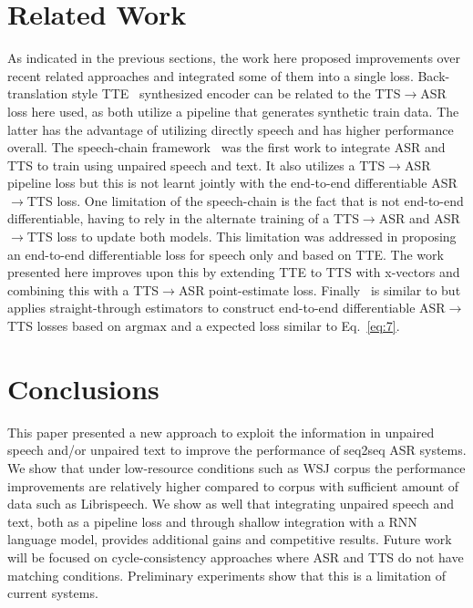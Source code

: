 \documentclass[a4paper]{article}
\begin{document}
\section{Related Work}
As indicated in the previous sections, the work here proposed improvements over recent related approaches and integrated some of them into a single loss. Back-translation style TTE~\cite{hayashi2018back} synthesized encoder can be related to the TTS$\rightarrow$ASR loss here used, as both utilize a pipeline that generates synthetic train data. The latter has the advantage of utilizing directly speech and has higher performance overall. The speech-chain framework~\cite{tjandra2017listening} was the first work to integrate ASR and TTS to train using unpaired speech and text. It also utilizes a TTS$\rightarrow$ASR pipeline loss but this is not learnt jointly with the end-to-end differentiable ASR$\rightarrow$TTS loss. One limitation of the speech-chain is the fact that is not end-to-end differentiable, having to rely in the alternate training of a TTS$\rightarrow$ASR and ASR$\rightarrow$TTS loss to update both models. This limitation was addressed in \cite{hori2018cycle} proposing an end-to-end differentiable loss for speech only and based on TTE. The work presented here improves upon this by extending TTE to TTS with x-vectors and combining this with a TTS$\rightarrow$ASR point-estimate loss. Finally~\cite{tjandra2018end} is similar to \cite{hori2018cycle} but applies straight-through estimators to construct end-to-end differentiable ASR$\rightarrow$TTS losses based on $\mathrm{argmax}$ and a expected loss similar to Eq.~\ref{eq:7}.


\section{Conclusions}
This paper presented a new approach to exploit the information in unpaired speech and/or unpaired text to improve the performance of seq2seq ASR systems. We show that under low-resource conditions such as WSJ corpus the performance improvements are relatively higher compared to corpus with sufficient amount of data such as Librispeech. We show as well that integrating unpaired speech and text, both as a pipeline loss and through shallow integration with a RNN language model, provides additional gains and competitive results. Future work will be focused on cycle-consistency approaches where ASR and TTS do not have matching conditions. Preliminary experiments show that this is a limitation of current systems.
\end{document}
